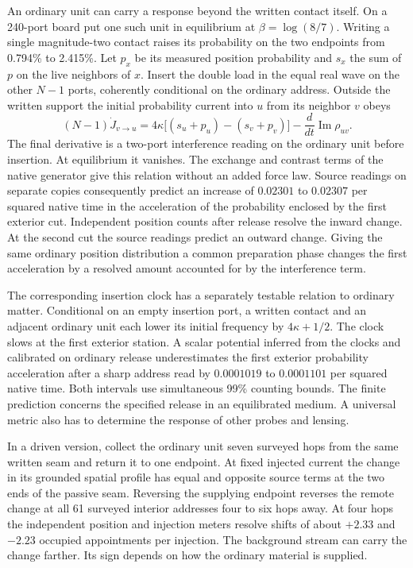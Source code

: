 \documentclass[11pt]{article}
\begin{document}
An ordinary unit can carry a response beyond the written contact itself.
On a 240-port board put one such unit in equilibrium at
$\beta=\log(8/7)$. Writing a single magnitude-two contact raises its
probability on the two endpoints from 0.794\% to 2.415\%.
Let $p_x$ be its measured position probability and $s_x$ the sum of
$p$ on the live neighbors of $x$. Insert the double load in the equal
real wave on the other $N-1$ ports, coherently conditional on the ordinary
address. Outside the written support the initial probability current
into $u$ from its neighbor $v$ obeys
\[
 (N-1)\dot J_{v\to u}=4\kappa\big[(s_u+p_u)-(s_v+p_v)\big]
              -\frac{d}{dt}\operatorname{Im}\rho_{uv}.
\]
The final derivative is a two-port interference reading on the ordinary
unit before insertion. At equilibrium it vanishes. The exchange and
contrast terms of the native generator give this relation without an
added force law. Source readings on separate copies consequently
predict an increase of $0.02301$ to $0.02307$ per squared native time
in the acceleration of the probability enclosed by the first exterior
cut. Independent position counts after release resolve the inward change.
At the second cut the source readings predict an outward change.
Giving the same ordinary position distribution a common preparation
phase changes the first acceleration by a resolved amount accounted
for by the interference term.

The corresponding insertion clock has a separately testable relation to
ordinary matter. Conditional on an empty insertion port, a written
contact and an adjacent ordinary unit each lower its initial frequency
by $4\kappa+1/2$. The clock slows at the first exterior station. A scalar
potential inferred from the clocks and calibrated on ordinary release
underestimates the first exterior probability acceleration after a sharp
address read by $0.0001019$ to $0.0001101$ per squared native time. Both
intervals use simultaneous 99\% counting bounds. The finite prediction
concerns the specified release in an equilibrated medium. A universal
metric also has to determine the response of other probes and lensing.

In a driven version, collect the ordinary unit seven surveyed hops from
the same written seam and return it to one endpoint. At fixed injected
current the change in its grounded spatial profile has equal and
opposite source terms at the two ends of the passive seam. Reversing
the supplying endpoint reverses the remote change at all 61 surveyed
interior addresses four to six hops away. At four hops the independent
position and injection meters resolve shifts of about $+2.33$ and
$-2.23$ occupied appointments per injection. The background stream
can carry the change farther. Its sign depends on how the ordinary
material is supplied.
\end{document}

